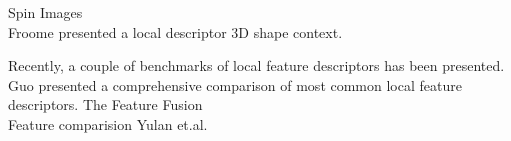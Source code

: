 \documentclass[10pt,twocolumn,letterpaper]{article}
\begin{document}
Spin Images \cite{Johnson1999}\\
Froome \etal \cite{Frome2004} presented a local descriptor 3D shape context.


Recently, a couple of benchmarks of local feature descriptors has been presented. Guo \etal \cite{Guo2015} presented a comprehensive comparison of most common local feature descriptors. The 
Feature Fusion \cite{Buch2016}\\
Feature comparision Yulan et.al. \cite{Guo2015}




\end{document}
